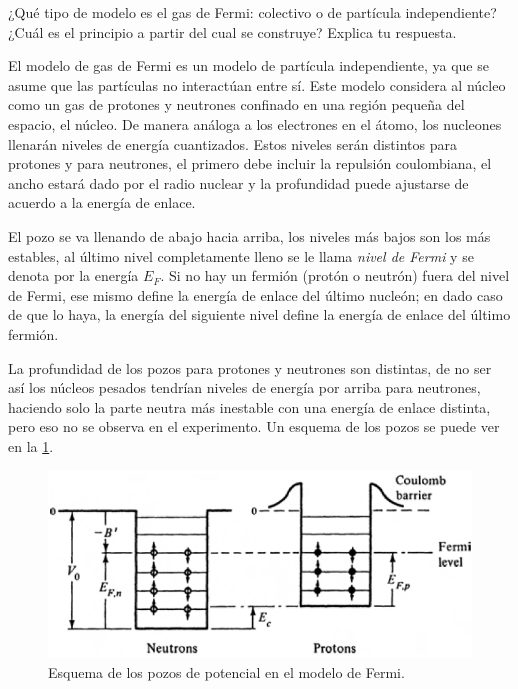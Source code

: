 \documentclass[./../main.tex]{subfiles}
\begin{document}
    \begin{exercise}
        ¿Qué tipo de modelo es el gas de Fermi: colectivo o de partícula independiente? ¿Cuál es el principio a partir del cual se construye? Explica tu respuesta.

        \begin{solution}
            El modelo de gas de Fermi es un modelo de partícula independiente, ya que se asume que las partículas no interactúan entre sí. 
            Este modelo considera al núcleo como un gas de protones y neutrones confinado en una región pequeña del espacio, el núcleo. De manera análoga a los electrones en el átomo, los nucleones llenarán niveles de energía cuantizados. Estos niveles serán distintos para protones y para neutrones, el primero debe incluir la repulsión coulombiana, el ancho estará dado por el radio nuclear y la profundidad puede ajustarse de acuerdo a la energía de enlace.

            El pozo se va llenando de abajo hacia arriba, los niveles más bajos son los más estables, al último nivel completamente lleno se le llama \emph{nivel de Fermi} y se denota por la energía \(E_{F}\). Si no hay un fermión (protón o neutrón) fuera del nivel de Fermi, ese mismo define la energía de enlace del último nucleón; en dado caso de que lo haya, la energía del siguiente nivel define la energía de enlace del último fermión.

            La profundidad de los pozos para protones y neutrones son distintas, de no ser así los núcleos pesados tendrían niveles de energía por arriba para neutrones, haciendo solo la parte neutra más inestable con una energía de enlace distinta, pero eso no se observa en el experimento. Un esquema de los pozos se puede ver en la \cref{fig:FermiGasModel}.

            \begin{figure}[htb]
                \centering
                \includegraphics{fermi-gas-model}
                \caption{Esquema de los pozos de potencial en el modelo de Fermi.\parencite{das2003introduction}}
                \label{fig:FermiGasModel}
            \end{figure}
        \end{solution}
    \end{exercise}
\end{document}
